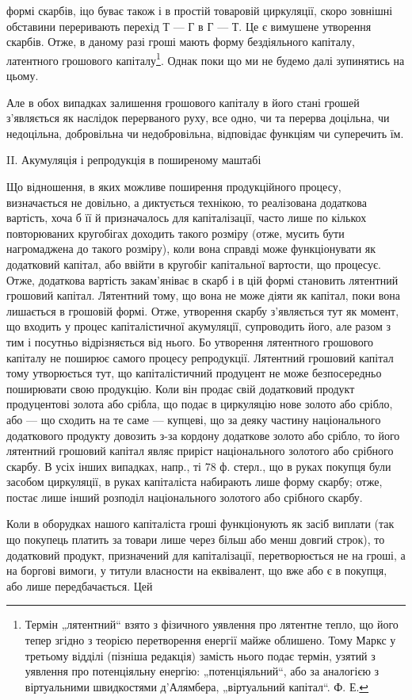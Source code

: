 формі скарбів, іцо буває також і в простій товаровій циркуляції, скоро
зовнішні обставини переривають перехід Т — Г в Г — Т. Це є вимушене
утворення скарбів. Отже, в даному разі гроші мають форму бездіяльного
капіталу, латентного грошового капіталу\footnote{
Термін „лятентний“ взято з фізичного уявлення про лятентне тепло, що
його тепер згідно з теорією перетворення енергії майже облишено. Тому Маркс
у третьому відділі (пізніша редакція) замість нього подає термін, узятий з уявлення
про потенціяльну енергію: „потенціяльний“, або за аналогією з віртуальними швидкостями
д’Алямбера, „віртуальний капітал“. Ф. Е.
}. Однак поки що ми не будемо
далі зупинятись на цьому.

Але в обох випадках залишення грошового капіталу в його стані
грошей з’являється як наслідок перерваного руху, все одно, чи та перерва
доцільна, чи недоцільна, добровільна чи недобровільна, відповідає функціям
чи суперечить їм.

II. Акумуляція і репродукція в поширеному маштабі

Що відношення, в яких можливе поширення продукційного процесу,
визначається не довільно, а диктується технікою, то реалізована додаткова
вартість, хоча б її й призначалось для капіталізації, часто лише по
кількох повторюваних кругобігах доходить такого розміру (отже, мусить
бути нагромаджена до такого розміру), коли вона справді може функціонувати
як додатковий капітал, або ввійти в кругобіг капітальної вартости,
що процесує. Отже, додаткова вартість закам’яніває в скарб і в цій
формі становить лятентний грошовий капітал. Лятентний тому, що вона не
може діяти як капітал, поки вона лишається в грошовій формі. Отже,
утворення скарбу з’являється тут як момент, що входить у процес капіталістичної
акумуляції, супроводить його, але разом з тим і посутньо
відрізняється від нього. Бо утворення лятентного грошового капіталу
не поширює самого процесу репродукції. Лятентний грошовий
капітал тому утворюється тут, що капіталістичний продуцент не може
безпосередньо поширювати свою продукцію. Коли він продає свій додатковий
продукт продуцентові золота або срібла, що подає в циркуляцію
нове золото або срібло, або — що сходить на те саме — купцеві, що
за деяку частину національного додаткового продукту довозить
з-за кордону додаткове золото або срібло, то його лятентний грошовий
капітал являє приріст національного золотого або срібного скарбу. В усіх
інших випадках, напр., ті 78 ф. стерл., що в руках покупця були засобом
циркуляції, в руках капіталіста набирають лише форму скарбу;
отже, постає лише інший розподіл національного золотого або срібного
скарбу.

Коли в оборудках нашого капіталіста гроші функціонують як засіб виплати
(так що покупець платить за товари лише через більш або менш довгий
строк), то додатковий продукт, призначений для капіталізації, перетворюється
не на гроші, а на боргові вимоги, у титули власности
на еквівалент, що вже або є в покупця, або лише передбачається. Цей